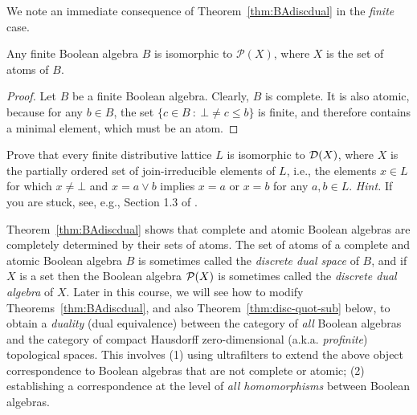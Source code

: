 We note an immediate consequence of Theorem~\ref{thm:BAdiscdual} in the \emph{finite} case.
\begin{corollary}
Any finite Boolean algebra $B$ is isomorphic to $\mathcal{P}(X)$, where $X$ is the set of atoms of $B$.
\end{corollary}
\begin{proof}
Let $B$ be a finite Boolean algebra. Clearly, $B$ is complete. It is also atomic, because for any $b \in B$, the set $\{c \in B \ \colon \ \bot \neq c \leq b\}$ is finite, and therefore contains a minimal element, which must be an atom.
\end{proof}
\begin{exercise}\medium
Prove that every finite distributive lattice $L$ is isomorphic to $\mathcal{D}(X)$, where $X$ is the partially ordered set of join-irreducible elements of $L$, i.e., the elements $x \in L$ for which $x \neq \bot$ and $x = a \vee b$ implies $x = a$ or $x = b$ for any $a, b \in L$. {\it Hint.} If you are stuck, see, e.g., Section 1.3 of \cite{thebook}.
\end{exercise}
Theorem~\ref{thm:BAdiscdual} shows that complete and atomic Boolean algebras are completely determined by their sets of atoms. The set of atoms of a complete and atomic Boolean algebra $B$ is sometimes called the \emph{discrete dual space} of $B$, and if $X$ is a set then the Boolean algebra $\mathcal{P}(X)$ is sometimes called the \emph{discrete dual algebra} of $X$. %
Later in this course, we will see how to modify Theorems~\ref{thm:BAdiscdual}, and also Theorem~\ref{thm:disc-quot-sub} below, to obtain a \emph{duality} (dual equivalence) between the category of \emph{all} Boolean algebras and the category of compact Hausdorff zero-dimensional (a.k.a. \emph{profinite}) topological spaces. This involves (1) using ultrafilters to extend the above object correspondence to Boolean algebras that are not complete or atomic; (2) establishing a correspondence at the level of \emph{all homomorphisms} between Boolean algebras. %

